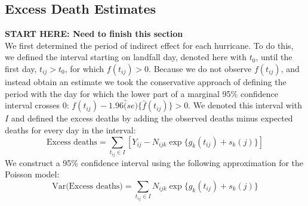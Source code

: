 \documentclass[11pt]{article}
\begin{document}
\subsection{Excess Death Estimates}
\textbf{START HERE: Need to finish this section} \\ 
We first determined the period of indirect effect for each hurricane. To do this, we defined the interval starting on landfall day, denoted here with $t_0$, until the first day, $t_{ij} > t_0$, for which $f(t_{ij})>0$. Because we do not observe $f(t_{ij})$, and instead obtain an estimate we took the conservative approach of defining the period with the day for which the lower part of a marginal 95\% confidence interval crosses 0: $f(t_{ij})−1.96\hat(se)\{\hat{f}(t_{ij})\}>0$. We denoted this interval with $I$ and defined the excess deaths by adding the observed deaths minus expected deaths for every day in the interval:
\begin{equation*}
    \mbox{Excess deaths} = \sum_{t_{ij} \in I} \left[Y_{ij} − N_{ijk}\exp\{g_k(t_{ij})+s_k(j)\}\right]
\end{equation*}
 We construct a 95\% confidence interval using the following approximation for the Poisson model:
 \begin{equation*}
    \mbox{Var(Excess deaths)} = \sum_{t_{ij} \in I} N_{ijk}\exp\{g_k(t_{ij})+s_k(j)\}
 \end{equation*}
 
\newpage


\end{document}
